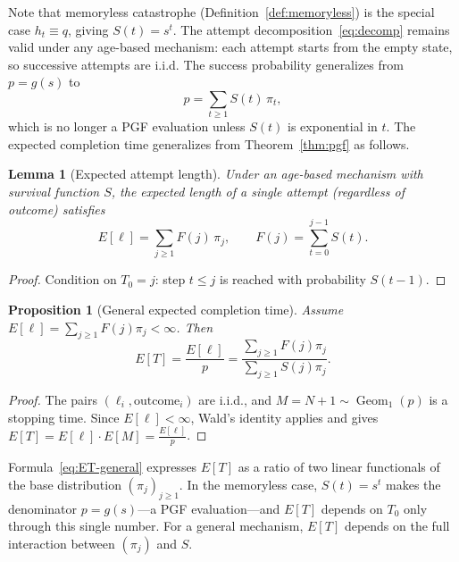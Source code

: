 \documentclass[11pt]{article}
\theoremstyle{plain}
\newtheorem{lemma}[theorem]{Lemma}
\newtheorem{proposition}[theorem]{Proposition}
\theoremstyle{definition}
\theoremstyle{remark}
\DeclareMathOperator{\Geom}{Geom}
\begin{document}
Note that memoryless catastrophe (Definition~\ref{def:memoryless}) is the special case $h_t \equiv q$, giving $S(t) = s^t$. The attempt decomposition~\eqref{eq:decomp} remains valid under any age-based mechanism: each attempt starts from the empty state, so successive attempts are i.i.d.  The success probability generalizes from $p = g(s)$ to
\begin{equation}\label{eq:p-general}
  p = \sum_{t \geq 1} S(t)\,\pi_t,
\end{equation}
which is no longer a PGF evaluation unless $S(t)$ is exponential in $t$.  The expected completion time generalizes from Theorem~\ref{thm:pgf} as follows.

\begin{lemma}[Expected attempt length]\label{lem:attempt-length}
Under an age-based mechanism with survival function $S$, the expected length of a single attempt (regardless of outcome) satisfies
\begin{equation}\label{eq:ell}
  E[\ell] = \sum_{j \geq 1} F(j)\,\pi_j, \qquad F(j) = \sum_{t=0}^{j-1} S(t).
\end{equation}
\end{lemma}


\begin{proof}
Condition on $T_0 = j$: step $t \leq j$ is reached with probability $S(t-1)$.
\end{proof}


\begin{proposition}[General expected completion time]\label{prop:ET-general}
Assume $E[\ell]=\sum_{j\ge1}F(j)\pi_j<\infty$. Then
\begin{equation}\label{eq:ET-general}
  E[T]=\frac{E[\ell]}{p}
  =\frac{\sum_{j\ge1}F(j)\pi_j}{\sum_{j\ge1}S(j)\pi_j}.
\end{equation}
\end{proposition}

\begin{proof}
The pairs $(\ell_i,\mathrm{outcome}_i)$ are i.i.d., and $M=N+1\sim \Geom_1(p)$ is a stopping time. Since $E[\ell]<\infty$, Wald's identity applies and gives $E[T]=E[\ell]\cdot E[M]=\frac{E[\ell]}{p}$.
\end{proof}

Formula~\eqref{eq:ET-general} expresses $E[T]$ as a ratio of two linear functionals of the base distribution $(\pi_j)_{j \geq 1}$.  In the memoryless case, $S(t) = s^t$ makes the denominator $p = g(s)$---a PGF evaluation---and $E[T]$ depends on $T_0$ only through this single number.  For a general mechanism, $E[T]$ depends on the full interaction between $(\pi_j)$ and $S$.  
\end{document}
